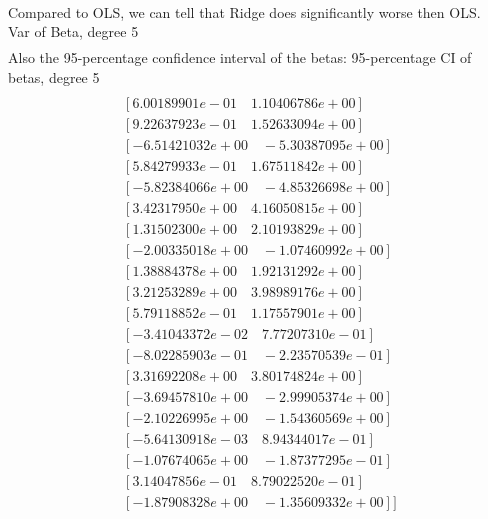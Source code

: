 \documentclass[a4paper,norsk]{article}
\begin{document}
\\Compared to OLS, we can tell that Ridge does significantly worse then OLS.
\\Var of Beta, degree 5
\begin{align*}
[ 0.00077004\quad  0.01729839\quad  0.01384995\quad  0.06816008\quad  0.06826285\quad  0.05696662\\
  0.0417508\quad   0.02034709\quad  0.06671475\quad  0.03500783 \quad 0.02294549\quad  0.01073849\\
  0.03470761\quad  0.01261125\quad  0.02127092 \quad 0.03349824 \quad 0.01062464 \quad 0.03548007\\
  0.03422875\quad  0.04204926\quad  0.02520149]
\end{align*}
Also the 95-percentage confidence interval of the betas:
95-percentage CI of betas, degree 5
\begin{align*}
[[  8.39518095e-01 \quad  9.45603016e-01]\\
   [  6.00189901e-01 \quad  1.10406786e+00]\\
   [  9.22637923e-01 \quad  1.52633094e+00]\\
   [ -6.51421032e+00 \quad -5.30387095e+00]\\
   [  5.84279933e-01 \quad  1.67511842e+00]\\
   [ -5.82384066e+00\quad  -4.85326698e+00]\\
   [  3.42317950e+00 \quad  4.16050815e+00]\\
   [  1.31502300e+00 \quad  2.10193829e+00]\\
   [ -2.00335018e+00\quad  -1.07460992e+00]\\
   [  1.38884378e+00\quad   1.92131292e+00]\\
   [  3.21253289e+00\quad   3.98989176e+00]\\
   [  5.79118852e-01 \quad  1.17557901e+00]\\
   [ -3.41043372e-02 \quad  7.77207310e-01]\\
   [ -8.02285903e-01 \quad -2.23570539e-01]\\
   [  3.31692208e+00\quad   3.80174824e+00]\\
   [ -3.69457810e+00\quad  -2.99905374e+00]\\
   [ -2.10226995e+00\quad  -1.54360569e+00]\\
   [ -5.64130918e-03 \quad  8.94344017e-01]\\
   [ -1.07674065e+00\quad  -1.87377295e-01]\\
   [  3.14047856e-01 \quad  8.79022520e-01]\\
   [ -1.87908328e+00\quad  -1.35609332e+00]]\\
\end{align*}
\end{document}
